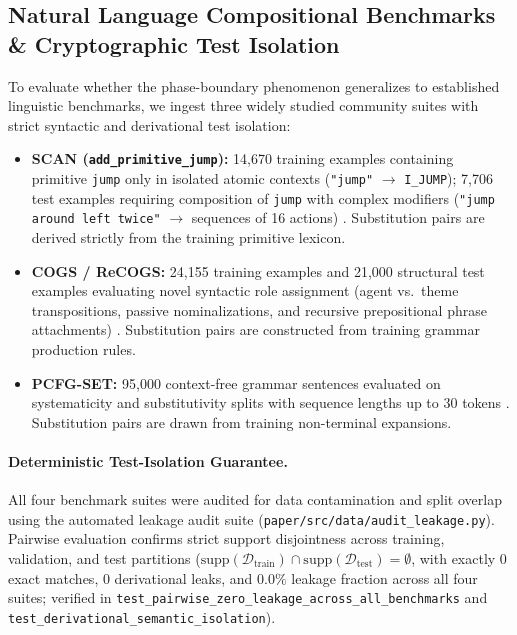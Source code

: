 \documentclass{article}
\theoremstyle{plain}
\theoremstyle{definition}
\begin{document}
\subsection{Natural Language Compositional Benchmarks \& Cryptographic Test Isolation}
\label{sec:appendix_external_benchmarks}
To evaluate whether the phase-boundary phenomenon generalizes to established linguistic benchmarks, we ingest three widely studied community suites with strict syntactic and derivational test isolation:
\begin{itemize}[leftmargin=*,noitemsep]
    \item \textbf{SCAN (\texttt{add\_primitive\_jump}):} 14,670 training examples containing primitive \texttt{jump} only in isolated atomic contexts (\texttt{"jump"} $\to$ \texttt{I\_JUMP}); 7,706 test examples requiring composition of \texttt{jump} with complex modifiers (\texttt{"jump around left twice"} $\to$ sequences of 16 actions) \citep{Lake2018Generalization}. Substitution pairs are derived strictly from the training primitive lexicon.
    \item \textbf{COGS / ReCOGS:} 24,155 training examples and 21,000 structural test examples evaluating novel syntactic role assignment (agent vs.\ theme transpositions, passive nominalizations, and recursive prepositional phrase attachments) \citep{Kim2020COGS,Wu2023ReCOGS}. Substitution pairs are constructed from training grammar production rules.
    \item \textbf{PCFG-SET:} 95,000 context-free grammar sentences evaluated on systematicity and substitutivity splits with sequence lengths up to 30 tokens \citep{Hupkes2019Compositionality}. Substitution pairs are drawn from training non-terminal expansions.
\end{itemize}

\paragraph{Deterministic Test-Isolation Guarantee.}
All four benchmark suites were audited for data contamination and split overlap using the automated leakage audit suite (\texttt{paper/src/data/audit\_leakage.py}). Pairwise evaluation confirms strict support disjointness across training, validation, and test partitions ($\text{supp}(\mathcal{D}_{\text{train}}) \cap \text{supp}(\mathcal{D}_{\text{test}}) = \emptyset$, with exactly 0 exact matches, 0 derivational leaks, and $0.0\%$ leakage fraction across all four suites; verified in \texttt{test\_pairwise\_zero\_leakage\_across\_all\_benchmarks} and \texttt{test\_derivational\_semantic\_isolation}).
\end{document}
